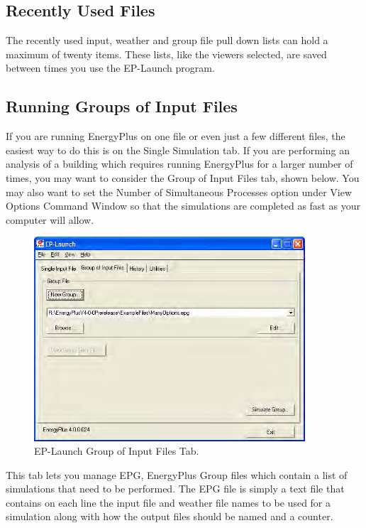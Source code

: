 \subsection{Recently Used Files}\label{recently-used-files}

The recently used input, weather and group file pull down lists can hold a maximum of twenty items. These lists, like the viewers selected, are saved between times you use the EP-Launch program.

\subsection{Running Groups of Input Files}\label{running-groups-of-input-files}

If you are running EnergyPlus on one file or even just a few different files, the easiest way to do this is on the Single Simulation tab. If you are performing an analysis of a building which requires running EnergyPlus for a larger number of times, you may want to consider the Group of Input Files tab, shown below. You may also want to set the Number of Simultaneous Processes option under View Options Command Window so that the simulations are completed as fast as your computer will allow.

\begin{figure}[hbtp] %
\centering
\includegraphics[width=0.9\textwidth, height=0.9\textheight, keepaspectratio=true]{media/image107.png}
\caption{EP-Launch Group of Input Files Tab. \protect \label{fig:ep-launch-group-of-input-files-tab.}}
\end{figure}

This tab lets you manage EPG, EnergyPlus Group files which contain a list of simulations that need to be performed. The EPG file is simply a text file that contains on each line the input file and weather file names to be used for a simulation along with how the output files should be named and a counter.

